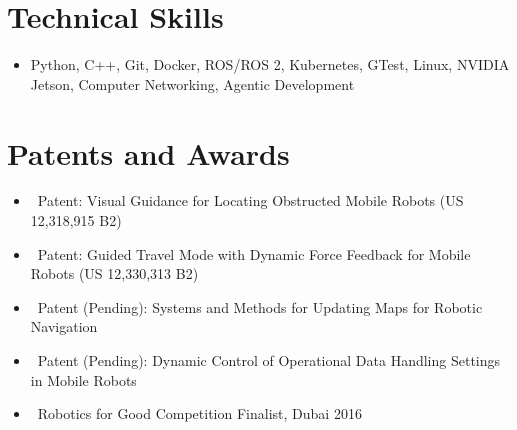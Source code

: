 \documentclass[letterpaper,10pt]{article}
\newcommand{\resumeItem}[1]{\item\small{#1}}
\newcommand{\resumeSubHeadingList}{\begin{itemize}[leftmargin=0.1in, label={}]}
\newcommand{\resumeSubHeadingListEnd}{\end{itemize}}
\newcommand{\resumeItemList}{\begin{itemize}[leftmargin=0.1in, label={}, itemsep=1pt, parsep=0pt, topsep=2pt]}
\newcommand{\resumeItemListEnd}{\end{itemize}\vspace{-2pt}}
\begin{document}
\section{Technical Skills}
\resumeSubHeadingList
  \resumeItem{Python, C++, Git, Docker, ROS/ROS 2, Kubernetes, GTest, Linux, NVIDIA Jetson, Computer Networking, Agentic Development}
\resumeSubHeadingListEnd

\section{Patents and Awards}
\resumeItemList
  \resumeItem{\textbullet\ Patent: Visual Guidance for Locating Obstructed Mobile Robots (US 12,318,915 B2)}
  \resumeItem{\textbullet\ Patent: Guided Travel Mode with Dynamic Force Feedback for Mobile Robots (US 12,330,313 B2)}
  \resumeItem{\textbullet\ Patent (Pending): Systems and Methods for Updating Maps for Robotic Navigation}
  \resumeItem{\textbullet\ Patent (Pending): Dynamic Control of Operational Data Handling Settings in Mobile Robots}
  \resumeItem{\textbullet\ Robotics for Good Competition Finalist, Dubai 2016}
\resumeItemListEnd
\end{document}
